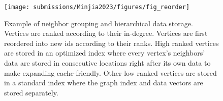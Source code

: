 
\begin{figure}
    \centering
    \texttt{[image: submissions/Minjia2023/figures/fig\_reorder]}
    \caption{Example of neighbor grouping and hierarchical data storage. 
            \textmd{
                    Vertices are ranked according to their in-degree. 
                 Vertices are first reordered into new ids according to their ranks.
                    High ranked vertices are stored in an optimized index where every vertex's neighbors' data are stored in consecutive locations right after its own data to make expanding cache-friendly. 
                    Other low ranked vertices are stored in a standard index where the graph index and data vectors are stored separately.}}
    \label{minjia_fig:fig_reorder}
\end{figure}

